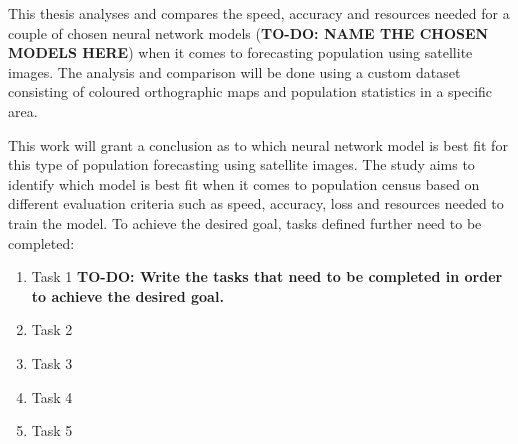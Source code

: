 This thesis analyses and compares the speed, accuracy and resources needed for a couple of chosen neural network models (\textbf{TO-DO: NAME THE CHOSEN MODELS HERE}) when it comes to forecasting population using satellite images. The analysis and comparison will be done using a custom dataset consisting of coloured orthographic maps and population statistics in a specific area.

This work will grant a conclusion as to which neural network model is best fit for this type of population forecasting using satellite images. The study aims to identify which model is best fit when it comes to population census based on different evaluation criteria such as speed, accuracy, loss and resources needed to train the model. To achieve the desired goal, tasks defined further need to be completed:
\begin{enumerate}
    \item Task 1 \textbf{TO-DO: Write the tasks that need to be completed in order to achieve the desired goal.}
    \item Task 2
    \item Task 3
    \item Task 4
    \item Task 5
\end{enumerate}